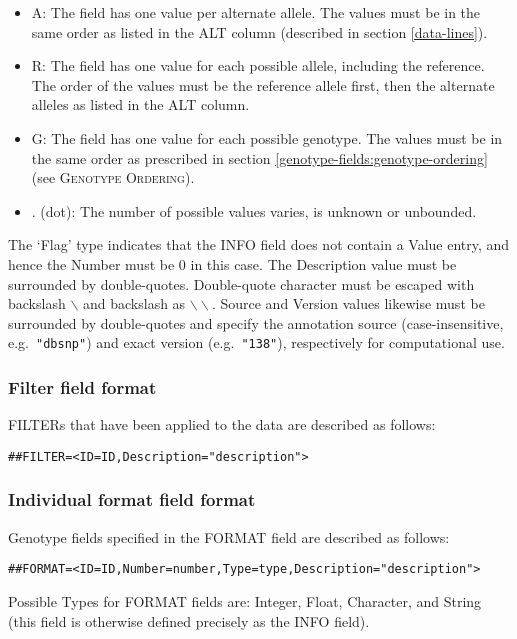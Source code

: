 \documentclass[8pt]{article}
\begin{document}
\begin{itemize}
  \item A: The field has one value per alternate allele.
  The values must be in the same order as listed in the ALT column (described in section \ref{data-lines}).
  \item R: The field has one value for each possible allele, including the reference.
  The order of the values must be the reference allele first, then the alternate alleles as listed in the ALT column.
  \item G: The field has one value for each possible genotype.
  The values must be in the same order as prescribed in section \ref{genotype-fields:genotype-ordering} (see \textsc{Genotype Ordering}).
  \item . (dot): The number of possible values varies, is unknown or unbounded.
\end{itemize}

The `Flag' type indicates that the INFO field does not contain a Value entry, and hence the Number must be $0$ in this case.
The Description value must be surrounded by double-quotes.
Double-quote character must be escaped with backslash $\backslash$ and backslash as $\backslash\backslash$.
Source and Version values likewise must be surrounded by double-quotes and specify the annotation source (case-insensitive, e.g.\ \verb|"dbsnp"|) and exact version (e.g.\ \verb|"138"|), respectively for computational use.

\subsubsection{Filter field format}
FILTERs that have been applied to the data are described as follows:

\begin{verbatim}
##FILTER=<ID=ID,Description="description">
\end{verbatim}

\subsubsection{Individual format field format}
Genotype fields specified in the FORMAT field are described as follows:

\begin{verbatim}
##FORMAT=<ID=ID,Number=number,Type=type,Description="description">
\end{verbatim}

Possible Types for FORMAT fields are: Integer, Float, Character, and String (this field is otherwise defined precisely as the INFO field).
\end{document}
